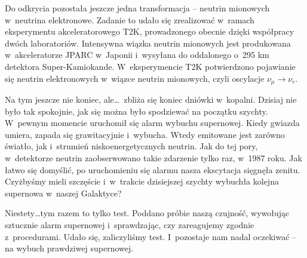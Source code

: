 \begin{dwieszpalty}
Do odkrycia pozostała jeszcze jedna transformacja -- neutrin mionowych w~neutrina elektronowe.
Zadanie to udało się zrealizować w~ramach eksperymentu akceleratorowego T2K, prowadzonego obecnie dzięki współpracy dwóch laboratoriów. Intensywna wiązka neutrin mionowych jest produkowana w~akceleratorze JPARC w~Japonii i~wysyłana do oddalonego o~295 km detektora Super-Kamiokande. W~eksperymencie T2K potwierdzono pojawianie się neutrin
elektronowych w~wiązce neutrin mionowych, czyli oscylacje $\nu_{\mu} \rightarrow \nu_e$. 

Na tym jeszcze nie koniec, ale\ldots\ zbliża się koniec dniówki w~kopalni. Dzisiaj nie było tak spokojnie, jak się można było spodziewać na początku szychty. W~pewnym momencie uruchomił się alarm wybuchu supernowej. Kiedy gwiazda umiera, zapada się grawitacyjnie i~wybucha. Wtedy emitowane jest zarówno światło, jak i~strumień niskoenergetycznych neutrin. Jak do tej pory, w~detektorze neutrin zaobserwowano takie zdarzenie tylko raz, w~1987 roku. Jak łatwo się domyślić, po uruchomieniu się alarmu nasza ekscytacja sięgnęła zenitu. Czyżbyśmy mieli szczęście i~w~trakcie dzisiejszej szychty wybuchła kolejna supernowa w~naszej Galaktyce? 

Niestety\ldots tym razem to tylko test. Poddano próbie naszą czujność, wywołując sztucznie alarm supernowej i~sprawdzając, czy zareagujemy zgodnie z~procedurami. Udało się, zaliczyliśmy test. I~pozostaje nam nadal oczekiwać -- na wybuch prawdziwej supernowej.
\end{dwieszpalty}

